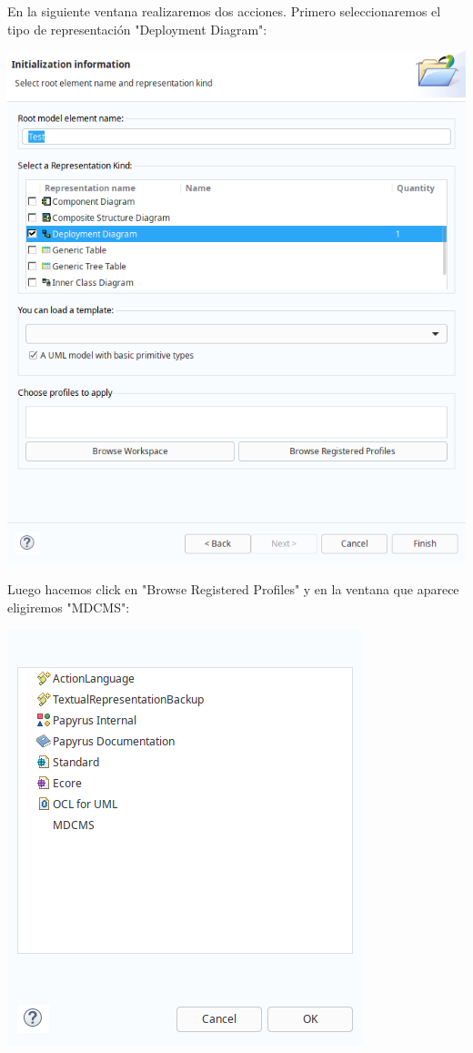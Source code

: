 \documentclass[11pt]{article}
\begin{document}
En la siguiente ventana realizaremos dos acciones. Primero
seleccionaremos el tipo de representación "Deployment Diagram":

\begin{center}
\includegraphics[width=.9\linewidth]{images/proyecto_5.png}
\end{center}

Luego hacemos click en "Browse Registered Profiles" y en la ventana
que aparece eligiremos "MDCMS":

\begin{center}
\includegraphics[width=.9\linewidth]{images/proyecto_6.png}
\end{center}
\end{document}
